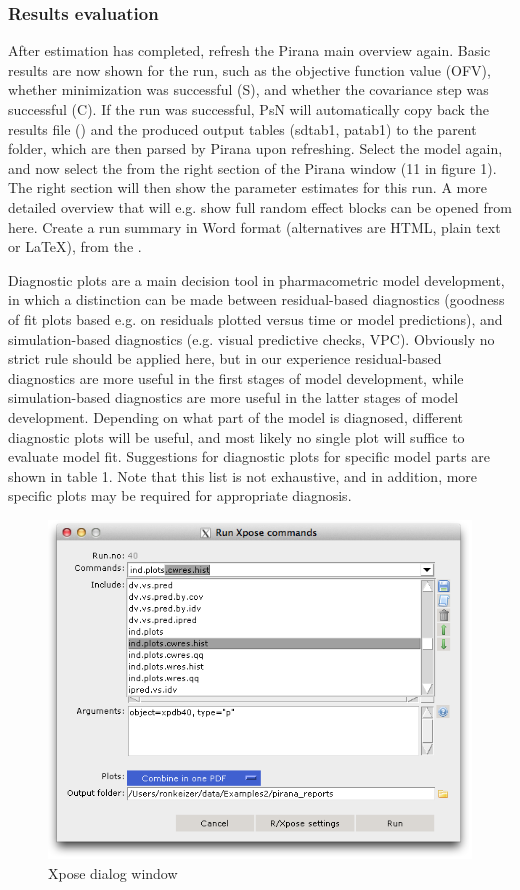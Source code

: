 \subsubsection{Results evaluation} After estimation has completed,
refresh the Pirana main overview again. Basic results are now shown
for the run, such as the objective function value (OFV), whether
minimization was successful (S), and whether the covariance step was
successful (C). If the run was successful, PsN will automatically copy
back the results file () and the produced output tables
(sdtab1, patab1) to the parent folder, which are then parsed by Pirana
upon refreshing. Select the model again, and now select the  from the right section of the Pirana window (11 in figure 1). The
right section will then show the parameter estimates for this run. A
more detailed overview that will e.g. show full random effect blocks
can be opened from here. Create a run summary in Word format
(alternatives are HTML, plain text or LaTeX), from the . 

Diagnostic plots are a main decision tool in pharmacometric model
development, in which a distinction can be made between residual-based
diagnostics (goodness of fit plots based e.g. on residuals plotted
versus time or model predictions), and simulation-based diagnostics
(e.g. visual predictive checks, VPC). Obviously no strict rule should
be applied here, but in our experience residual-based diagnostics are
more useful in the first stages of model development, while
simulation-based diagnostics are more useful in the latter stages of
model development. Depending on what part of the model is diagnosed,
different diagnostic plots will be useful, and most likely no single
plot will suffice to evaluate model fit. Suggestions for diagnostic
plots for specific model parts are shown in table 1. Note that this
list is not exhaustive, and in addition, more specific plots may be
required for appropriate diagnosis.

\begin{figure}[H] \centering
    \includegraphics[scale=0.4]{images/fig3_xposeGUI.png}
    \caption{Xpose dialog window}
\end{figure}

